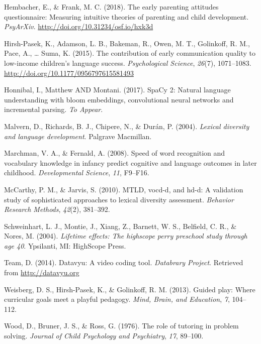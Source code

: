 \documentclass[man,floatsintext]{apa6}
\begin{document}
\leavevmode\hypertarget{ref-Hembacher2018}{}%
Hembacher, E., \& Frank, M. C. (2018). The early parenting attitudes questionnaire: Measuring intuitive theories of parenting and child development. \emph{PsyArXiv}. \url{http://doi.org/10.31234/osf.io/hxk3d}

\leavevmode\hypertarget{ref-HirshPasek2015}{}%
Hirsh-Pasek, K., Adamson, L. B., Bakeman, R., Owen, M. T., Golinkoff, R. M., Pace, A., \ldots{} Suma, K. (2015). The contribution of early communication quality to low-income children's language success. \emph{Psychological Science}, \emph{26}(7), 1071--1083. \url{http://doi.org/10.1177/0956797615581493}

\leavevmode\hypertarget{ref-spacy2}{}%
Honnibal, I., Matthew AND Montani. (2017). SpaCy 2: Natural language understanding with bloom embeddings, convolutional neural networks and incremental parsing. \emph{To Appear}.

\leavevmode\hypertarget{ref-Malvern2004}{}%
Malvern, D., Richards, B. J., Chipere, N., \& Durán, P. (2004). \emph{Lexical diversity and language development}. Palgrave Macmillan.

\leavevmode\hypertarget{ref-Marchman2008}{}%
Marchman, V. A., \& Fernald, A. (2008). Speed of word recognition and vocabulary knowledge in infancy predict cognitive and language outcomes in later childhood. \emph{Developmental Science}, \emph{11}, F9--F16.

\leavevmode\hypertarget{ref-McCarthy2010}{}%
McCarthy, P. M., \& Jarvis, S. (2010). MTLD, vocd-d, and hd-d: A validation study of sophisticated approaches to lexical diversity assessment. \emph{Behavior Research Methods}, \emph{42}(2), 381--392.

\leavevmode\hypertarget{ref-PerryPreschool2004}{}%
Schweinhart, L. J., Montie, J., Xiang, Z., Barnett, W. S., Belfield, C. R., \& Nores, M. (2004). \emph{Lifetime effects: The highscope perry preschool study through age 40}. Ypsilanti, MI: HighScope Press.

\leavevmode\hypertarget{ref-datavyu}{}%
Team, D. (2014). Datavyu: A video coding tool. \emph{Databrary Project}. Retrieved from \url{http://datavyu.org}

\leavevmode\hypertarget{ref-Weisberg2013}{}%
Weisberg, D. S., Hirsh-Pasek, K., \& Golinkoff, R. M. (2013). Guided play: Where curricular goals meet a playful pedagogy. \emph{Mind, Brain, and Education}, \emph{7}, 104--112.

\leavevmode\hypertarget{ref-Wood1976}{}%
Wood, D., Bruner, J. S., \& Ross, G. (1976). The role of tutoring in problem solving. \emph{Journal of Child Psychology and Psychiatry}, \emph{17}, 89--100.

\endgroup
\end{document}
